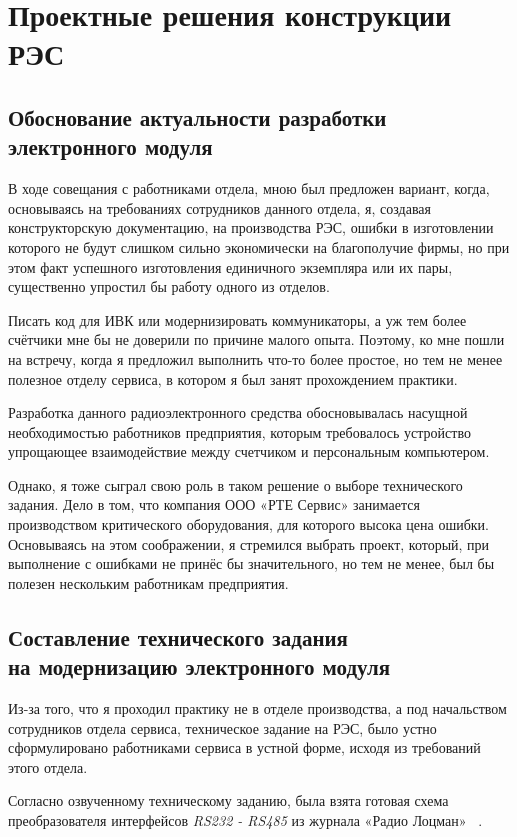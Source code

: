 \section{Проектные решения конструкции РЭС}

\subsection{Обоснование актуальности разработки электронного модуля}

В ходе совещания с работниками отдела,
мною был предложен вариант,
когда, основываясь на требованиях сотрудников данного
отдела, я, создавая конструкторскую документацию,
на производства РЭС, ошибки в изготовлении которого не будут
слишком сильно экономически на благополучие фирмы,
но при этом факт успешного изготовления
единичного экземпляра или их пары,
существенно упростил бы работу одного из отделов.

Писать код для ИВК или модернизировать коммуникаторы,
а уж тем более счётчики мне бы не доверили по причине
малого опыта. Поэтому, ко мне пошли на встречу, когда
я предложил выполнить что-то более простое,
но тем не менее полезное отделу сервиса,
в котором я был занят прохождением практики.


Разработка данного радиоэлектронного средства обосновывалась
насущной необходимостью работников предприятия,
которым требовалось устройство упрощающее взаимодействие
между счетчиком и персональным компьютером.

Однако, я тоже сыграл свою роль в таком решение о выборе технического задания.
Дело в том, что компания ООО «РТЕ Сервис» занимается производством
критического оборудования, для которого высока цена ошибки.
Основываясь на этом соображении,
я стремился выбрать проект,
который,
при выполнение с ошибками не принёс бы значительного,
но тем не менее, был бы полезен нескольким работникам предприятия.

\subsection{Составление технического задания\\
  на модернизацию электронного модуля}

Из-за того, 
что я проходил практику не в отделе производства,
а под начальством сотрудников отдела сервиса,
техническое задание на РЭС,
было устно сформулировано работниками сервиса
в устной форме, исходя из требований этого отдела.

Согласно озвученному техническому заданию,
была взята готовая схема преобразователя интерфейсов
\textit{RS232 - RS485} из
журнала «Радио Лоцман» ~\cite{rlocman-rs-converter}.

